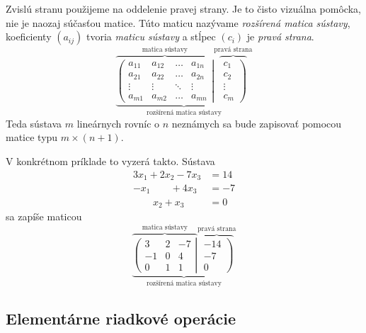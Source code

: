 \documentclass{article}
\begin{document}
Zvislú stranu použijeme na oddelenie pravej strany. Je to čisto vizuálna pomôcka, nie
je naozaj súčasťou matice. Túto maticu nazývame \emph{rozšírená matica sústavy},
koeficienty $(a_{ij})$ tvoria \emph{maticu sústavy} a stĺpec $(c_i)$ je \emph{pravá
strana}.
$$
\underbrace{
    \overbrace{
        \left(
        \begin{array}{cccc}
            a_{11} & a_{12} & \dots & a_{1n} \\
            a_{21} & a_{22} & \dots & a_{2n} \\
            \vdots & \vdots & \ddots & \vdots \\
            a_{m1} & a_{m2} & \dots & a_{mn}
        \end{array}
        \right|
    }^{\text{matica sústavy}}
    \overbrace{
        \left.
        \begin{array}{c}
            c_{1} \\
            c_{2} \\
            \vdots \\
            c_{m}
        \end{array}
        \right)
    }^{\text{pravá strana}}
}_{\text{rozšírená matica sústavy}}
$$
Teda sústava $m$ lineárnych rovníc o $n$ neznámych sa bude zapisovať
pomocou matice typu $m\times(n+1)$.

V konkrétnom príklade to vyzerá takto.
Sústava
\begin{align*}
    3x_{1} + 2x_{2} - 7x_{3} &= 14 \\
    -x_{1} \qquad + 4x_{3} &= -7 \\
    \qquad x_{2} + x_{3} &= 0
\end{align*}
sa zapíše maticou
$$ \underbrace{
\overbrace{
\left(
\begin{array}{ccc}
3 & 2 & -7 \\
-1 & 0 & 4 \\
0 & 1 & 1 
\end{array}
\right|
}^{\text{matica sústavy}}
\overbrace{
\left.
\begin{array}{c}
-14 \\
-7 \\
0
\end{array}
\right)
}^{\text{pravá strana}}
}_{\text{rozšírená matica sústavy}}
$$
\subsection{Elementárne riadkové operácie}
\end{document}
